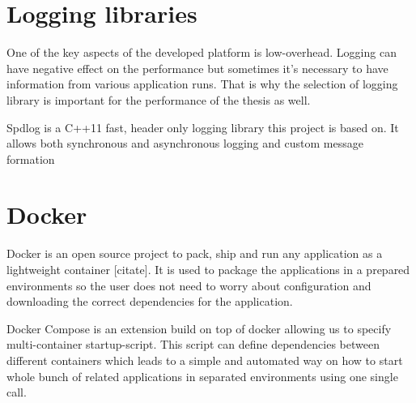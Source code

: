 \section{Logging libraries}
One of the key aspects of the developed platform is low-overhead. Logging can have negative effect on the performance but sometimes it's necessary to have information from various application runs. That is why the selection of logging library is important for the performance of the thesis as well. 

Spdlog is a C++11 fast, header only logging library this project is based on. It allows both synchronous and asynchronous logging and custom message formation
\section{Docker}
Docker is an open source project to pack, ship and run any application as a lightweight container [citate]. It is used to package the applications in a prepared environments so the user does not need to worry about configuration and downloading the correct dependencies for the application. 

Docker Compose is an extension build on top of docker allowing us to specify multi-container startup-script. This script can define dependencies between different containers which leads to a simple and automated way on how to start whole bunch of related applications in separated environments using one single call. 

